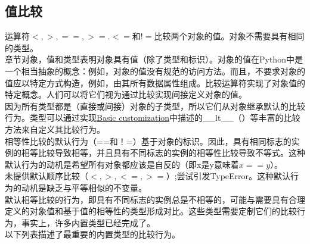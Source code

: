 \documentclass[10pt,UTF8]{ctexart}
\begin{document}
\subsection{值比较}
运算符$<, >, ==, > =. <=$和$!=$比较两个对象的值。对象不需要具有相同的类型。\\
\indent 章节对象，值和类型表明对象具有值（除了类型和标识）。对象的值在Python中是一个相当抽象的概念：例如，对象的值没有规范的访问方法。而且，不要求对象的值应以特定方式构造，例如，由其所有数据属性组成。比较运算符实现了对象值的特定概念。人们可以将它们视为通过比较实现间接定义对象的值。\\
\indent 因为所有类型都是（直接或间接）对象的子类型，所以它们从对象继承默认的比较行为。类型可以通过实现\href{https://docs.python.org/3/reference/datamodel.html#customization}{Basic customization}中描述的__lt__（）等丰富的比较方法来自定义其比较行为。\\
\indent 相等性比较的默认行为（==和！=）基于对象的标识。因此，具有相同标志的实例的相等比较导致相等，并且具有不同标志的实例的相等性比较导致不等式。这种默认行为的动机是希望所有对象都应该是自反的（即x是y意味着$x == y$）。\\
\indent 未提供默认顺序比较（$<,>,<=,> =$）;尝试引发TypeError。这种默认行为的动机是缺乏与平等相似的不变量。\\
\indent 默认相等比较的行为，即具有不同标志的实例总是不相等的，可能与需要具有合理定义的对象值和基于值的相等性的类型形成对比。这些类型需要定制它们的比较行为，事实上，许多内置类型已经完成了。\\
\indent 以下列表描述了最重要的内置类型的比较行为。
\end{document}

